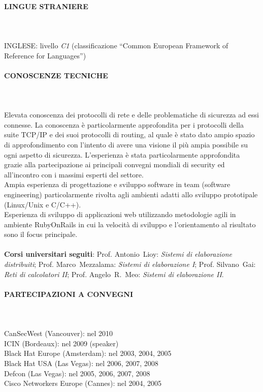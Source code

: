 \documentclass[a4paper, 10pt]{article}
\begin{document}
\paragraph{LINGUE STRANIERE}
\ \\
\ \\
INGLESE: livello \emph{C1} (classificazione ``Common European Framework of
Reference for Languages'')
\\
\paragraph{CONOSCENZE TECNICHE}
\ \\
\ \\
Elevata conoscenza dei protocolli di rete e delle problematiche di sicurezza
ad essi connesse. La conoscenza \`e particolarmente approfondita per i
protocolli della suite TCP/IP e dei suoi protocolli di routing, al quale \`e 
stato dato ampio spazio di approfondimento con l'intento di avere una
visione il pi\`u ampia possibile su ogni aspetto di sicurezza. L'esperienza
\`e stata particolarmente approfondita grazie alla
partecipazione ai principali convegni mondiali di security ed all'incontro
con i massimi esperti del settore.\\
Ampia esperienza di progettazione e sviluppo software in team (software
engineering) particolarmente rivolta agli ambienti adatti allo sviluppo
prototipale (Linux/Unix e C/C++).\\
Esperienza di sviluppo di applicazioni web utilizzando metodologie agili in 
ambiente RubyOnRails in cui la velocit\`a di sviluppo e l'orientamento al
risultato sono il focus principale.
\\
\ \\
\textbf{Corsi universitari seguiti}: Prof. \mbox{Antonio Lioy}: 
\emph{Sistemi di elaborazione 
distribuiti}; Prof. \mbox{Marco Mezzalama}: \emph{Sistemi di elaborazione I}; 
Prof. \mbox{Silvano Gai}: \emph{Reti di calcolatori II}; Prof. \mbox{Angelo
R. Meo}: \emph{Sistemi di elaborazione II}.
\\
\paragraph{PARTECIPAZIONI A CONVEGNI}
\ \\
\ \\
CanSecWest (Vancouver): nel 2010
\\
ICIN (Bordeaux): nel 2009 (speaker)
\\
Black Hat Europe (Amsterdam): nel 2003, 2004, 2005
\\
Black Hat USA (Las Vegas): nel 2006, 2007, 2008
\\
Defcon (Las Vegas): nel 2005, 2006, 2007, 2008
\\
Cisco Networkers Europe (Cannes): nel 2004, 2005
\\
\end{document}
